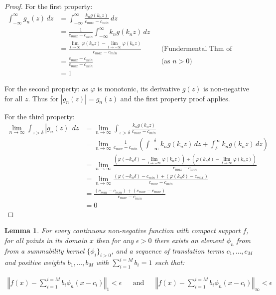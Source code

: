 \documentclass{article} %
\newtheorem{lem}[thm]{Lemma}
\newcommand{\dlim}{\displaystyle\lim}
\begin{document}
\begin{proof}
For the first property:
\begin{align}
	\int_{-\infty}^{\infty} g_n(z) \, dz &=  \int_{-\infty}^{\infty} \frac{k_n g(k_nz)}{c_{max} - c_{min}} \, dz \\
	&= \frac{1}{c_{max} - c_{min}} \int_{-\infty}^{\infty} k_n g(k_n z) \, dz \\
	&= \frac{\dlim_{t \to \infty} \varphi(k_n z) - \dlim_{t \to -\infty} \varphi(k_n z)}{c_{max} - c_{min}} && \text{(Fundermental Thm of Calculus)}\\
	&= \frac{c_{max} - c_{min}}{c_{max} - c_{min}}  && \text{(as $n>0$)}\\
	&= 1	
\end{align}
	
For the second property: as  $\varphi$ is monotonic, its derivative $g(z)$ is non-negative for all $z$. Thus for $|g_n(z)|=g_n(z)$ and the first property proof applies.

For the third property:
\begin{align}
	\lim_{n\to\infty} \int_{z>\delta} |g_n(z)|\, dz 
	 &= \lim_{n\to\infty} \int_{z>\delta} \frac{k_n g(k_n z)}{c_{max} - c_{min}} \\
	 &= \lim_{n\to\infty} \frac{1}{c_{max} - c_{min}} 
		 \left( \int_{-\infty}^{-\delta} k_n g(k_n z) \, dz 
		 + \int_\delta^\infty k_n g(k_n z) \, dz \right) \\
	 &= \lim_{n\to\infty} \frac{
	 	\left(\varphi(-k_n\delta)-\dlim_{t \to -\infty} \varphi(k_n z)\right)
	 	 + \left( \varphi(k_n\delta) - \dlim_{t \to \infty} \varphi(k_n z)\right)}%
	 	 {c_{max} - c_{min}} \\
	 &= \lim_{n\to\infty} \frac{
	 	\left(\varphi(-k_n\delta)-c_{min} \right)
	 	+ \left( \varphi(k_n\delta) - c_{max} \right)}%
	    {c_{max} - c_{min}} \\
	 &= \frac{
	 	\left(c_{min}-c_{min} \right)
	 	+ \left(c_{max} - c_{max} \right)}%
		{c_{max} - c_{min}} \\
	 &= 0
\end{align}

\end{proof}

\begin{lem}\label{lem:approxwithsummability}
For every continuous non-negative function with compact support $f$,
for all points in its domain $x$
then for any $\epsilon >0$ there exists an element $\phi_n$ from from a summability kernel $\lbrace \phi_i  \rbrace_{i>0}$, and a sequence of translation terms $c_1,\ldots,c_M$ and positive weights $b_1,\ldots,b_M$ with $\sum_{i=1}^{i=M} b_i = 1$ such that:


\begin{align}
\left\Vert f(x)-\sum_{i=1}^{i=M}b_{i}\phi_{n}(x-c_i)\right\Vert _{1}<\epsilon &&
 \text{and} &&
\left\Vert f(x)-\sum_{i=1}^{i=M}b_{i}\phi_{n}(x-c_i)\right\Vert _{\infty}<\epsilon
\end{align}

\end{lem}
\end{document}
